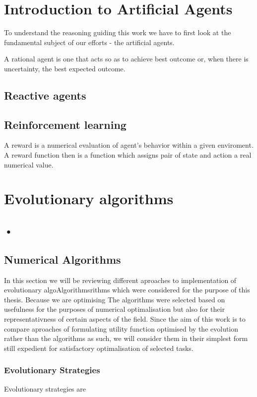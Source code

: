 \chapter{Introduction to Artificial Agents}
To understand the reasoning guiding this work we have to first look at the fundamental subject of our efforts - the artificial agents.
\begin{defn}\citep{russell2021}
A rational agent is one that acts so as to achieve
best outcome or, when there is uncertainty, the best expected outcome.
\end{defn}
\section{Reactive agents}



\section{Reinforcement learning}
\begin{defn}
A reward is a numerical evaluation of agent's behavior within a given enviroment. A reward function then is a function which assigns pair of state and action a real numerical value.
\end{defn}
\chapter{Evolutionary algorithms}

\section{•}

\section{Numerical Algorithms}
In this section we will be reviewing different aproaches to implementation of evolutionary algoAlgorithmsrithms which were considered
for the purpose of this thesis.
Because we are optimising
The algorithms were selected based on usefulness for the purposes of numerical optimalisation but also for their representativness of certain aspects of the field.
Since the aim of this work is to compare aproaches of formulating utility function optimised by the evolution rather than the algorithms as such, 
we will consider them in their simplest form still expedient for satisfactory optimalisation of selected tasks.
\subsection{Evolutionary Strategies}
Evolutionary strategies are 
